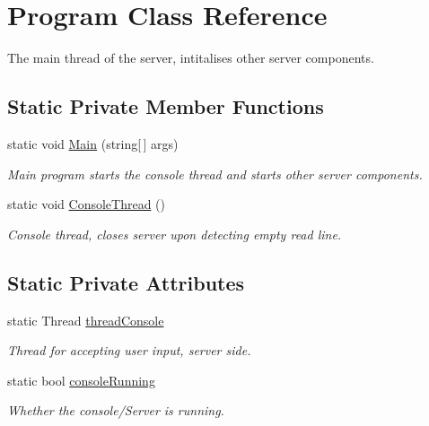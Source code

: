 \hypertarget{class_program}{}\section{Program Class Reference}
\label{class_program}


The main thread of the server, intitalises other server components.  


\subsection*{Static Private Member Functions}
\begin{DoxyCompactItemize}
\item 
static void \mbox{\hyperlink{class_program_ada72f8d1518f89bc2e6ad807d5059564}{Main}} (string\mbox{[}$\,$\mbox{]} args)
\begin{DoxyCompactList}\small\item\em Main program starts the console thread and starts other server components. \end{DoxyCompactList}\item 
static void \mbox{\hyperlink{class_program_a26b88087186eee007cda56afadba413b}{Console\+Thread}} ()
\begin{DoxyCompactList}\small\item\em Console thread, closes server upon detecting empty read line. \end{DoxyCompactList}\end{DoxyCompactItemize}
\subsection*{Static Private Attributes}
\begin{DoxyCompactItemize}
\item 
static Thread \mbox{\hyperlink{class_program_ae9e0fdfd8f03f67dd94c12d12c27381c}{thread\+Console}}
\begin{DoxyCompactList}\small\item\em Thread for accepting user input, server side. \end{DoxyCompactList}\item 
static bool \mbox{\hyperlink{class_program_a35293fe7c6f7bb00df67b738216dbb88}{console\+Running}}
\begin{DoxyCompactList}\small\item\em Whether the console/\+Server is running. \end{DoxyCompactList}\end{DoxyCompactItemize}


